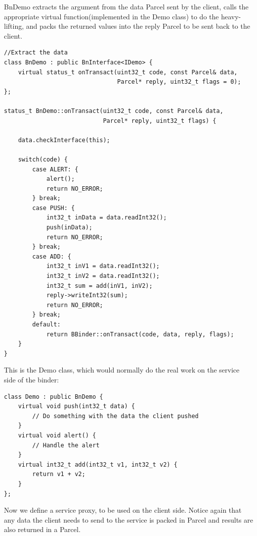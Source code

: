 \documentclass[11pt, a4paper]{book}
\begin{document}
BnDemo extracts the argument from the data Parcel sent by the client, calls the
appropriate virtual function(implemented in the Demo class) to do the
heavy-lifting, and packs the returned values into the reply Parcel to be sent
back to the client.
\begin{verbatim}
//Extract the data
class BnDemo : public BnInterface<IDemo> {
    virtual status_t onTransact(uint32_t code, const Parcel& data,
                                Parcel* reply, uint32_t flags = 0);
};

status_t BnDemo::onTransact(uint32_t code, const Parcel& data,
                            Parcel* reply, uint32_t flags) {

    data.checkInterface(this);

    switch(code) {
        case ALERT: {
            alert();
            return NO_ERROR;
        } break;
        case PUSH: {
            int32_t inData = data.readInt32();
            push(inData);
            return NO_ERROR;
        } break;
        case ADD: {
            int32_t inV1 = data.readInt32();
            int32_t inV2 = data.readInt32();
            int32_t sum = add(inV1, inV2);
            reply->writeInt32(sum);
            return NO_ERROR;
        } break;
        default:
            return BBinder::onTransact(code, data, reply, flags);
    }
}
\end{verbatim}

This is the Demo class, which would normally do the real work on the service
side of the binder:
\begin{verbatim}
class Demo : public BnDemo {
    virtual void push(int32_t data) {
        // Do something with the data the client pushed
    }
    virtual void alert() {
        // Handle the alert
    }
    virtual int32_t add(int32_t v1, int32_t v2) {
        return v1 + v2;
    }
};
\end{verbatim}

Now we define a service proxy, to be used on the client side. Notice again that
any data the client needs to send to the service is packed in Parcel and results
are also returned in a Parcel.
\end{document}
